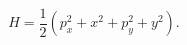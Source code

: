 \begin{equation}
H = \frac{1}{2}\left( p^2_x + x^2 +p^2_y +y^2 \right).
\label{eq:Haf}
\end{equation}

